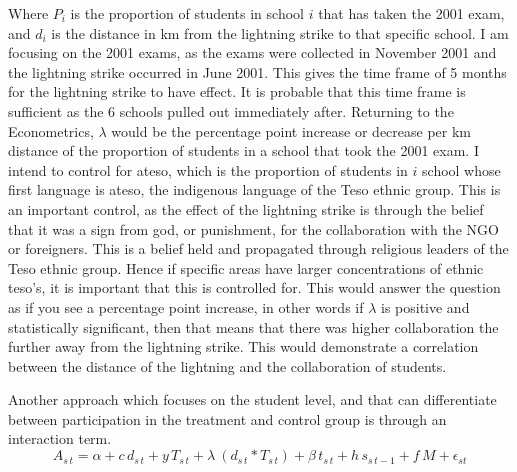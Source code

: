 \documentclass{article}
\begin{document}
Where $P_i$ is the proportion of students in school $i$ that has taken the 2001 exam, and $d_i$ is the distance in km from the lightning strike to that specific school. I am focusing on the 2001 exams, as the exams were collected in November 2001 and the lightning strike occurred in June 2001. This gives the time frame of 5 months for the lightning strike to have effect. It is probable that this time frame is sufficient as the 6 schools pulled out immediately after. Returning to the Econometrics, $\lambda$ would be the percentage point increase or decrease per km distance of the proportion of students in a school that took the 2001 exam. I intend to control for ateso, which is the proportion of students in $i$ school whose first language is ateso, the indigenous language of the Teso ethnic group. This is an important control, as the effect of the lightning strike is through the belief that it was a sign from god, or punishment, for the collaboration with the NGO or foreigners. This is a belief held and propagated through religious leaders of the Teso ethnic group. Hence if specific areas have larger concentrations of ethnic teso's, it is important that this is controlled for. This would answer the question as if you see a percentage point increase, in other words if $\lambda$ is positive and statistically significant, then that means that there was higher collaboration the further away from the lightning strike. This would demonstrate a correlation between the distance of the lightning and the collaboration of students. 

Another approach which focuses on the student level, and that can differentiate between participation in the treatment and control group is through an interaction term.
\[ A_{s\,t} = \alpha + c\,d_{s\,t} + y\,T_{s\,t} +  \lambda\ (d_{s\,t}* T_{s\,t})+\beta \,t_{s\,t}+h\, s_{s\,t-1}+ f\, M+ \epsilon_{s t}\]
\end{document}
